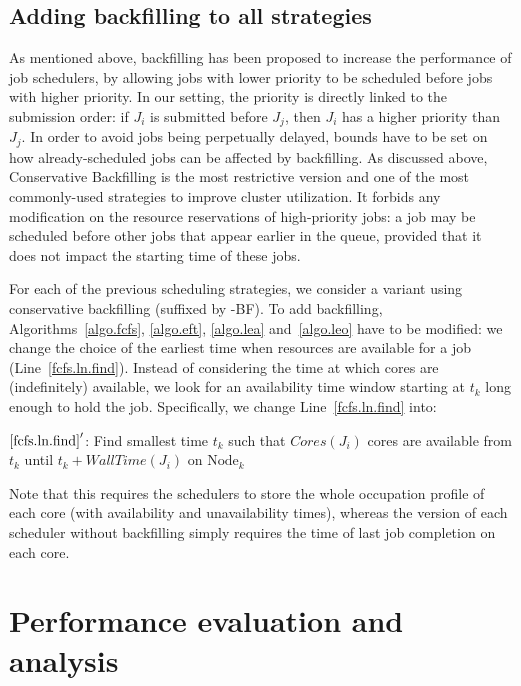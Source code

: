 \documentclass[sigconf,review,anonymous]{acmart}
\newcommand{\Node}[1]{\ensuremath{\mathrm{Node}_{#1}}\xspace}
\newcommand{\core}{\mathit{Cores}\xspace}
\newcommand{\walltime}{\mathit{WallTime}\xspace}
\begin{document}
\subsection{Adding backfilling to all strategies}

As mentioned above, backfilling has been proposed to increase the
performance of job schedulers, by allowing jobs with lower priority to be
scheduled before jobs with higher priority. In our setting, the
priority is directly linked to the submission order: if $J_i$ is
submitted before $J_j$, then $J_i$ has a higher priority than $J_j$.
In order to avoid jobs
being perpetually delayed, bounds have to be set on how already-scheduled
jobs can be affected by backfilling. As discussed above,
Conservative Backfilling is the most restrictive version and one of
the most commonly-used strategies to improve cluster utilization. It
forbids any modification on the resource
reservations of high-priority jobs: a job may be scheduled
before other jobs that appear earlier in the queue, provided that it
does not impact the starting time of these jobs.


For each of the previous scheduling strategies, we consider a variant
using conservative backfilling (suffixed by -BF).  To add
backfilling, Algorithms~\ref{algo.fcfs}, \ref{algo.eft},
\ref{algo.lea} and~\ref{algo.leo} have to be modified: we change the
choice of the earliest time when resources are available for a job
(Line~\ref{fcfs.ln.find}). Instead of considering the time at which
cores are (indefinitely) available, we look for an availability time
window starting at $t_k$ long enough to hold the
job. Specifically, we change Line~\ref{fcfs.ln.find} into:
\begin{algorithmic}[0]
  \State $\ref{fcfs.ln.find}'$: Find smallest time $t_k$ such that $\core(J_i)$ cores are
  available from $t_k$ until $t_k + \walltime(J_i)$ on $\Node{k}$
\end{algorithmic}

Note that this requires the schedulers to store  the whole occupation profile of
each core (with availability and unavailability times), whereas the
version of each scheduler without backfilling simply requires the time
of last job completion on each core.

\section{Performance evaluation and analysis}\label{sec.evaluations}
\end{document}
